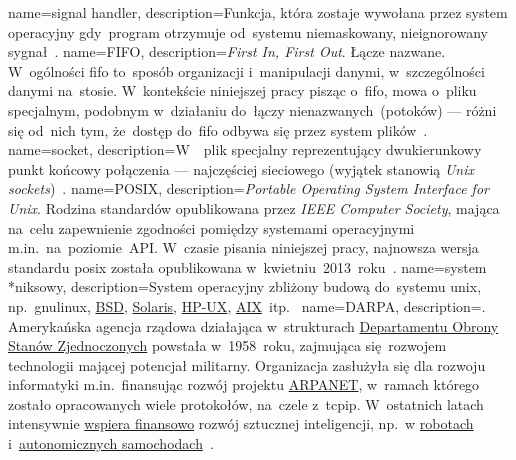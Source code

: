 {
	name={signal handler},
	description={Funkcja, która zostaje wywołana przez system operacyjny gdy~program otrzymuje od~systemu niemaskowany, nieignorowany sygnał~\cite{signal-handler}.}
}
{
	name={FIFO},
	description={\emph{First In, First Out}. Łącze nazwane. W~ogólności \gls{fifo} to~sposób organizacji i~manipulacji danymi, w~szczególności danymi na~stosie. W~kontekście niniejszej pracy pisząc o~\gls{fifo}, mowa o~pliku specjalnym, podobnym w~działaniu do~łączy nienazwanych~(potoków) --- różni się od~nich tym, że~dostęp do~\gls{fifo} odbywa się przez system plików~\cite{fifo-manual}.}
}
{
	name={socket},
	description={W~~plik specjalny reprezentujący dwukierunkowy punkt końcowy połączenia --- najczęściej sieciowego (wyjątek stanowią \emph{Unix sockets})~\cite{socket-definition-oracle}.}
}
{
	name={POSIX},
	description={\emph{Portable Operating System Interface for Unix}. Rodzina standardów opublikowana przez \emph{IEEE Computer Society}, mająca na~celu zapewnienie zgodności pomiędzy systemami operacyjnymi m.in.~na~poziomie~API. W~czasie pisania niniejszej pracy, najnowsza wersja standardu \gls{posix} została opublikowana w~kwietniu~2013~roku~\cite{posix-ieee,posix-opengroup}.}
}
{
	name={system \mbox{*niksowy}},
	description={System operacyjny zbliżony budową do~systemu \gls{unix}, np.~\gls{gnulinux}, \href{https://en.wikipedia.org/wiki/Berkeley_Software_Distribution}{BSD}, \href{https://en.wikipedia.org/wiki/Solaris_(operating_system)}{Solaris}, \href{https://en.wikipedia.org/wiki/HP-UX}{HP-UX}, \href{https://en.wikipedia.org/wiki/Secure_Shell}{AIX}~itp.~\cite{wiki:unix-like}}
}
{
	name={DARPA},
	description={. Amerykańska agencja rządowa działająca w~strukturach \href{https://en.wikipedia.org/wiki/United_States_Department_of_Defense}{Departamentu Obrony Stanów Zjednoczonych} powstała w~1958~roku, zajmująca się~rozwojem technologii mającej potencjał militarny. Organizacja zasłużyła się dla rozwoju informatyki m.in.~finansując rozwój projektu \href{https://en.wikipedia.org/wiki/ARPANET}{ARPANET}, w~ramach którego zostało opracowanych wiele protokołów, na~czele z~\gls{tcpip}. W~ostatnich latach intensywnie \href{https://en.wikipedia.org/wiki/SyNAPSE}{wspiera finansowo} rozwój sztucznej inteligencji, np.~w \href{https://en.wikipedia.org/wiki/DARPA_Robotics_Challenge}{robotach} i~\href{https://en.wikipedia.org/wiki/DARPA_Grand_Challenge}{autonomicznych samochodach}~\cite{darpa-grandchallange,darpa-robotics-challange,darpa-robotics-challange-ieee}.}
}
